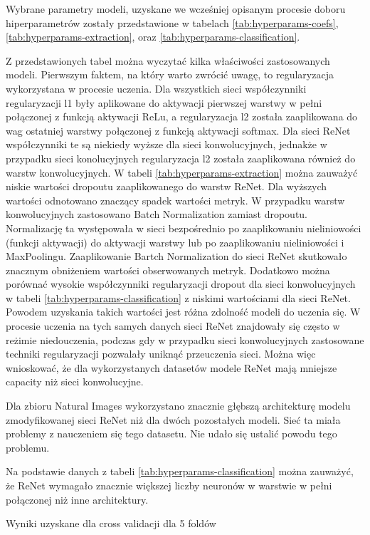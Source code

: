 \documentclass[oneside, mag]{mgr}
\begin{document}
Wybrane parametry modeli, uzyskane we wcześniej opisanym procesie doboru hiperparametrów zostały przedstawione w tabelach \ref{tab:hyperparams-coefs}, \ref{tab:hyperparams-extraction}, oraz \ref{tab:hyperparams-classification}.

Z przedstawionych tabel można wyczytać kilka właściwości zastosowanych modeli. Pierwszym faktem, na który warto zwrócić uwagę, to regularyzacja wykorzystana w procesie uczenia.
Dla wszystkich sieci współczynniki regularyzacji l1 były aplikowane do aktywacji pierwszej warstwy w pełni połączonej z funkcją aktywacji ReLu, a regularyzacja l2 została zaaplikowana do wag ostatniej warstwy połączonej z funkcją aktywacji softmax. Dla sieci ReNet współczynniki te są niekiedy wyższe dla sieci konwolucyjnych, jednakże w przypadku sieci konolucyjnych regularyzacja l2 została zaaplikowana również do warstw konwolucyjnych.
W tabeli \ref{tab:hyperparams-extraction} można zauważyć niskie wartości dropoutu zaaplikowanego do warstw ReNet. Dla wyższych wartości odnotowano znaczący spadek wartości metryk. W przypadku warstw konwolucyjnych zastosowano Batch Normalization zamiast dropoutu. Normalizację ta występowała w sieci bezpośrednio po zaaplikowaniu nieliniowości (funkcji aktywacji) do aktywacji warstwy lub po zaaplikowaniu nieliniowości i MaxPoolingu. Zaaplikowanie Bartch Normalization do sieci ReNet skutkowało znacznym obniżeniem wartości obserwowanych metryk. 
Dodatkowo można porównać wysokie współczynniki regularyzacji dropout dla sieci konwolucyjnych w tabeli \ref{tab:hyperparams-classification} z niskimi wartościami dla sieci ReNet. 
Powodem uzyskania takich wartości jest różna zdolność modeli do uczenia się. W procesie uczenia na tych samych danych sieci ReNet znajdowały się często w reżimie niedouczenia, podczas gdy w przypadku sieci konwolucyjnych zastosowane techniki regularyzacji pozwalały uniknąć przeuczenia sieci. Można więc wnioskować, że dla wykorzystanych datasetów modele ReNet mają mniejsze capacity niż sieci konwolucyjne.

Dla zbioru Natural Images wykorzystano znacznie głębszą architekturę modelu zmodyfikowanej sieci ReNet niż dla dwóch pozostałych modeli. Sieć ta miała problemy z nauczeniem się tego datasetu. Nie udało się ustalić powodu tego problemu.

Na podstawie danych z tabeli \ref{tab:hyperparams-classification} można zauważyć, że ReNet wymagało znacznie większej liczby neuronów w warstwie w pełni połączonej niż inne architektury.

\begin{table}[ht]
    \centering
    \caption{Wyniki uzyskane dla cross validacji dla 5 foldów}
    
    \label{table:cross_validation}
\end{table}
\end{document}
